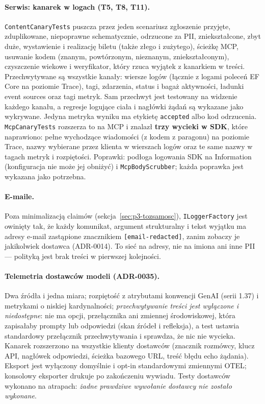 \paragraph{Serwis: kanarek w logach (T5, T8, T11).} \texttt{ContentCanaryTests}
puszcza przez jeden scenariusz zgłoszenie przyjęte, zduplikowane, niepoprawne
schematycznie, odrzucone za PII, zniekształcone, zbyt duże, wystawienie i
realizację biletu (także złego i zużytego), ścieżkę MCP, usuwanie kodem (znanym,
powtórzonym, nieznanym, zniekształconym), czyszczenie wiekowe i weryfikator, który
rzuca wyjątek z kanarkiem w treści. Przechwytywane są wszystkie kanały: wiersze
logów (łącznie z logami poleceń EF Core na poziomie Trace), tagi, zdarzenia, status i
bagaż aktywności, ładunki event sources oraz tagi metryk. Sam przechwyt jest testowany
na widzenie każdego kanału, a regresje logujące ciała i nagłówki żądań są wykazane
jako wykrywane. Jedyna metryka wyniku ma etykietę \texttt{accepted} albo kod
odrzucenia. \texttt{McpCanaryTests} rozszerza to na MCP i znalazł \textbf{trzy wycieki
w SDK}, które naprawiono: pełne wychodzące wiadomości (z kodem z paragonu) na poziomie
Trace, nazwy wybierane przez klienta w wierszach logów oraz te same nazwy w tagach
metryk i rozpiętości. Poprawki: podłoga logowania SDK na Information (konfiguracja nie
może jej obniżyć) i \texttt{McpBodyScrubber}; każda poprawka jest wykazana jako potrzebna.

\paragraph{E-maile.} Poza minimalizacją claimów (sekcja~\ref{sec:p3-tozsamosc}),
\texttt{ILoggerFactory} jest owinięty tak, że każdy komunikat, argument
strukturalny i tekst wyjątku ma adresy e-mail zastąpione
znacznikiem \texttt{[email-\allowbreak redacted]}, zanim zobaczy je jakikolwiek dostawca (ADR-0014). To
sieć na adresy, nie na imiona ani inne PII --- polityką jest brak treści w pierwszej
kolejności.

\paragraph{Telemetria dostawców modeli (ADR-0035).} Dwa źródła i jedna miara;
rozpiętość  z atrybutami konwencji GenAI (serii 1.37) i
metrykami o niskiej kardynalności; \emph{przechwytywanie treści jest wyłączone i
niedostępne}: nie ma opcji, przełącznika ani zmiennej środowiskowej, która
zapisałaby prompty lub odpowiedzi (skan źródeł i refleksja), a test ustawia standardowy
przełącznik przechwytywania i sprawdza, że nic nie wycieka. Kanarek rozszerzono na
wszystkie klienty dostawców (znacznik rozmówcy, klucz API, nagłówek odpowiedzi, ścieżka
bazowego URL, treść błędu echo żądania). Eksport jest wyłączony domyślnie i opt-in
standardowymi zmiennymi OTEL; konsolowy eksporter drukuje po zakończeniu wywiadu. Testy
dostawców wykonano na atrapach: \emph{żadne prawdziwe wywołanie dostawcy nie zostało
wykonane}.

